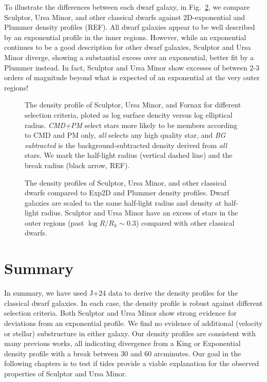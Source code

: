 To illustrate the differences between each dwarf galaxy, in
Fig.~\ref{fig:classical_dwarfs_densities}, we compare Sculptor, Ursa
Minor, and other classical dwarfs against 2D-exponential and Plummer
density profiles (REF). All dwarf galaxies appear to be well described
by an exponential profile in the inner regions. However, while an
exponential continues to be a good description for other dwarf galaxies,
Sculptor and Ursa Minor diverge, showing a substantial excess over an
exponential, better fit by a Plummer instead. In fact, Sculptor and Ursa
Minor show excesses of between 2-3 orders of magnitude beyond what is
expected of an exponential at the very outer regions!

\begin{figure}
\centering
{}
\caption[Sculptor density profiles]{The density profile of Sculptor,
Ursa Minor, and Fornax for different selection criteria, ploted as log
surface dencity versus log elliptical radius. \emph{CMD+PM} select stars
more likely to be members according to CMD and PM only, \emph{all}
selects any high quality star, and \emph{BG subtracted} is the
background-subtracted density derived from \emph{all} stars. We mark the
half-light radius (vertical dashed line) and the break radius (black
arrow, REF).}\label{fig:scl_observed_profiles}
\end{figure}

\begin{figure}
\centering
{}
\caption[Classical dwarf density profiles]{The density profiles of
Sculptor, Ursa Minor, and other classical dwarfs compared to Exp2D and
Plummer density profiles. Dwarf galaxies are scaled to the same
half-light radius and density at half-light radius. Sculptor and Ursa
Minor have an excess of stars in the outer regions (past
\(\log R/R_h \sim 0.3\)) compared with other classical
dwarfs.}\label{fig:classical_dwarfs_densities}
\end{figure}

\section{Summary}\label{summary}

In summary, we have used J+24 data to derive the density profiles for
the classical dwarf galaxies. In each case, the density profile is
robust against different selection criteria. Both Sculptor and Ursa
Minor show strong evidence for deviations from an exponential profile.
We find no evidence of additional (velocity or stellar) substructure in
either galaxy. Our density profiles are consistent with many previous
works, all indicating divergence from a King or Exponential density
profile with a break between 30 and 60 arcminutes. Our goal in the
following chapters is to test if tides provide a viable explanation for
the observed properties of Sculptor and Ursa Minor.
